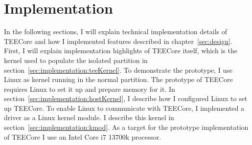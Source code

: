 \chapter{Implementation}
\label{sec:implementation}


In the following sections, I will explain technical implementation details of
TEECore and how I implemented features described in chapter~\ref{sec:design}.
First, I will explain implementation highlights of TEECore itself, which is the
kernel used to populate the isolated partition in
section~\ref{sec:implementation:teeKernel}. To demonstrate the prototype, I use
Linux as kernel running in the normal partition. The prototype of TEECore
requires Linux to set it up and prepare memory for it. In
section~\ref{sec:implementation:hostKernel}, I describe how I configured Linux
to set up TEECore. To enable Linux to communicate with TEECore, I
implemented a driver as a Linux kernel module. I describe this kernel in
section~\ref{sec:implementation:kmod}. As a target for the prototype
implementation of TEECore I use an Intel Core i7 13700k processor.

